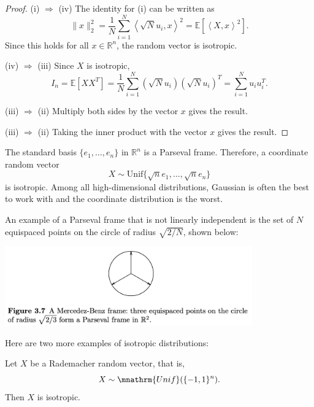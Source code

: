 \begin{proof}
(i) $\Rightarrow$ (iv)
The identity for (i) can be written as 
\[ \lVert x \rVert_{2}^2 = \frac{1}{N} \sum_{i = 1}^{N} \left\langle \sqrt{N} u_i, x \right\rangle^2 
= \mathbb{E}[\left\langle X, x \right\rangle^2]. \]
Since this holds for all $x \in \mathbb{R}^n$, the random vector is isotropic.

(iv) $\Rightarrow$ (iii)
Since $X$ is isotropic, 
\[ I_n = \mathbb{E}[XX^T] = \frac{1}{N}\sum_{i = 1}^{N} \left( \sqrt{N} u_i \right) 
\left( \sqrt{N} u_i \right)^T = \sum_{i = 1}^{N} u_i u_i^T. \]

(iii) $\Rightarrow$ (ii)
Multiply both sides by the vector $x$ gives the result.

(iii) $\Rightarrow$ (ii)
Taking the inner product with the vector $x$ gives the result.
\end{proof}

\begin{example}
\label{ex:3.3.12}
The standard basis $\{e_1, \dots, e_n\}$ in $\mathbb{R}^n$ is a Parseval frame. Therefore, a coordinate 
random vector 
\[ X \sim \mathrm{Unif}\{\sqrt{n}e_1, \dots, \sqrt{n}e_n\} \]
is isotropic. Among all high-dimensional distributions, Gaussian is often the best to work with and the 
coordinate distribution is the worst.
\end{example}

\begin{example}
\label{ex:3.3.13}
An example of a Parseval frame that is not linearly independent is the set of $N$ equispaced points on the 
circle of radius $\sqrt{2/N}$, shown below:
\begin{center}
	\includegraphics[width=0.8\textwidth]{Chapter 3/fig3-7.png}
\end{center}
\end{example}

Here are two more examples of isotropic distributions:

\begin{example}
\label{ex:3.3.14}
Let $X$ be a Rademacher random vector, that is, 
\[ X \sim \mnathrm{Unif}(\{-1, 1\}^n). \]
Then $X$ is isotropic.
\end{example}

